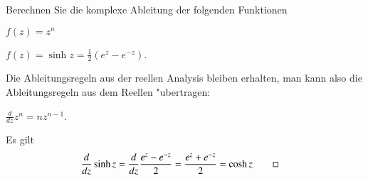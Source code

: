 Berechnen Sie die komplexe Ableitung der folgenden Funktionen
\begin{teilaufgaben}
\item $f(z)=z^n$
\item $f(z)=\operatorname{sinh}z=\frac12(e^z-e^{-z})$.
\end{teilaufgaben}

\begin{loesung}
Die Ableitungsregeln aus der reellen Analysis bleiben erhalten,
man kann also die Ableitungsregeln aus dem Reellen "ubertragen:
\begin{teilaufgaben}
\item $\frac{d}{dz}z^n=nz^{n-1}$.
\item Es gilt
\begin{align*}
\frac{d}{dz}\operatorname{sinh}z
&=
\frac{d}{dz}\frac{e^z-e^{-z}}2
=
\frac{e^z+e^{-z}}2=\operatorname{cosh}z
\qedhere
\end{align*}
\end{teilaufgaben}
\end{loesung}

